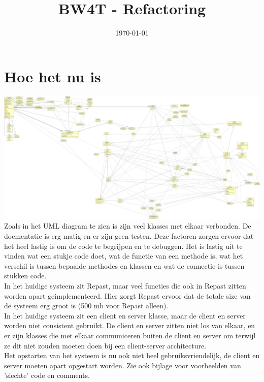 \documentclass[11pt,a4paper]{article}
\title{BW4T - Refactoring}
\date{\today}
\begin{document}
\maketitle

\section{Hoe het nu is}
\includegraphics[width=\linewidth]{old.png}
Zoals in het UML diagram te zien is zijn veel klasses met elkaar verbonden. De docmentatie is erg matig en er zijn geen testen. Deze factoren zorgen ervoor dat het heel lastig is om de code te begrijpen en te debuggen. Het is lastig uit te vinden wat een stukje code doet, wat de functie van een methode is, wat het verschil is tussen bepaalde methodes en klassen en wat de connectie is tussen stukken code. \\
In het huidige systeem zit Repast, maar veel functies die ook in Repast zitten worden apart geimplementeerd. Hier zorgt Repast ervoor dat de totale size van de systeem erg groot is (500 mb voor Repast alleen). \\
In het huidige systeem zit een client en server klasse, maar de client en server worden niet consistent gebruikt. De client en server zitten niet los van elkaar, en er zijn klasses die met elkaar communiceren buiten de client en server om terwijl ze dit niet zouden moeten doen bij een client-server architecture. \\
Het opstarten van het systeem is nu ook niet heel gebruiksvriendelijk, de client en server moeten apart opgestart worden. 
Zie ook bijlage voor voorbeelden van 'slechte' code en comments.
\end{document}
